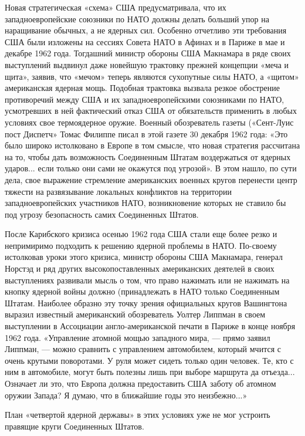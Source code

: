 \documentclass[12pt, a4paper, openany]{book}
\begin{document}
	Новая стратегическая «схема» США предусматривала, что их западноевропейские союзники по НАТО должны делать больший упор на наращивание обычных, а не ядерных сил. Особенно отчетливо эти требования США были изложены на сессиях Совета НАТО в Афинах и в Париже в мае и декабре 1962 года. Тогдашний министр обороны США Макнамара в ряде своих выступлений выдвинул даже новейшую трактовку прежней концепции «меча и щита», заявив, что «мечом» теперь являются сухопутные силы НАТО, а «щитом» американская ядерная мощь. Подобная трактовка вызвала резкое обострение противоречий между США и их западноевропейскими союзниками по НАТО, усмотревших в ней фактический отказ США от обязательств применить в любых условиях свое термоядерное оружие. Военный обозреватель газеты («Сент-Луис пост Диспетч» Томас Филиппе писал в этой газете 30 декабря 1962 года: «Это было широко истолковано в Европе в том смысле, что новая стратегия рассчитана на то, чтобы дать возможность Соединенным Штатам воздержаться от ядерных ударов... если только они сами не окажутся под угрозой». В этом нашло, по сути дела, свое выражение стремление американских военных кругов перенести центр тяжести на развязывание локальных конфликтов на территории западноевропейских участников НАТО, возникновение которых не ставило бы под угрозу безопасность самих Соединенных Штатов.
	
	После Карибского кризиса осенью 1962 года США стали еще более резко и непримиримо подходить к решению ядерной проблемы в НАТО. По-своему истолковав уроки этого кризиса, министр обороны США Макнамара, генерал Норстэд и ряд других высокопоставленных американских деятелей в своих выступлениях развивали мысль о том, что право нажимать или не нажимать на кнопку ядерной войны должно (принадлежать в НАТО только Соединенным Штатам. Наиболее образно эту точку зрения официальных кругов Вашингтона выразил известный американский обозреватель Уолтер Липпман в своем выступлении в Ассоциации англо-американской печати в Париже в конце ноября 1962 года. «Управление атомной мощью западного мира, — прямо заявил Липпман, — можно сравнить с управлением автомобилем, который мчится с очень крутыми поворотами. У руля может сидеть только один человек. Те, кто с ним в автомобиле, могут быть полезны лишь при выборе маршрута да отъезда... Означает ли это, что Европа должна предоставить США заботу об атомном оружии Запада? Я думаю, что в ближайшие годы это неизбежно...»
	
	
	План «четвертой ядерной державы» в этих условиях уже не мог устроить правящие круги Соединенных Штатов.
	
\end{document}
